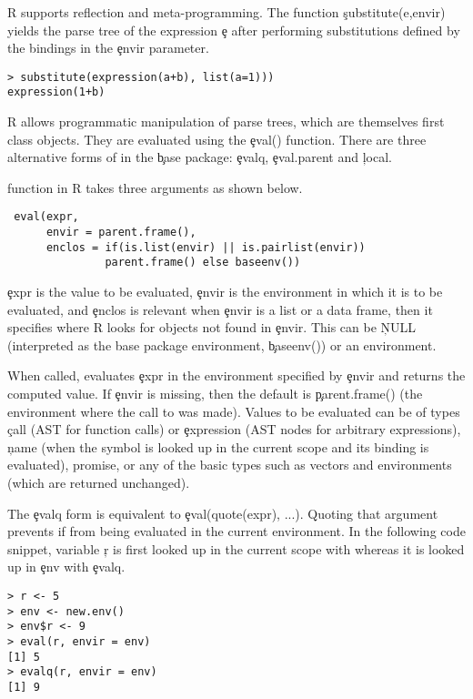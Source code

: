 \documentclass[USenglish,cleveref, autoref, thm-restate]{lipics-v2019}
\begin{document}
R supports reflection and meta-programming. The function \c{substitute(e,envir)}
yields the parse tree of the expression \c{e} after performing substitutions
defined by the bindings in the \c{envir} parameter.

\begin{lstlisting}
> substitute(expression(a+b), list(a=1)))  
expression(1+b)
\end{lstlisting}

\noindent
R allows programmatic manipulation of parse trees, which are themselves
first class objects. They are evaluated using the \c{eval()}
function. There are three alternative forms  of \eval in the \c{base} package:
\c{evalq}, \c{eval.parent} and \c{local}.

\eval function in R takes three arguments as shown below.
\begin{lstlisting}
 eval(expr,
      envir = parent.frame(),
      enclos = if(is.list(envir) || is.pairlist(envir))
               parent.frame() else baseenv())
\end{lstlisting}           

\c{expr} is the value to be evaluated, \c{envir}
is the environment in which it is to be evaluated, and \c{enclos} is
relevant when \c{envir} is a list or a data frame, then it specifies where R
looks for objects not found in \c{envir}. This can be \c{NULL} (interpreted
as the base package environment, \c{baseenv()}) or an environment.

When called, \eval evaluates \c{expr} in the environment specified by
\c{envir} and returns the computed value. If \c{envir} is missing, then the
default is \c{parent.frame()} (the environment where the call to \eval was
made).  Values to be evaluated can be of types \c{call} (AST for function
calls) or \c{expression} (AST nodes for arbitrary expressions), \c{name}
(when the symbol is looked up in the current scope and its binding is
evaluated), promise, or any of the basic types such as vectors and
environments (which are returned unchanged).

The \c{evalq} form is equivalent to \c{eval(quote(expr), ...)}.  Quoting
that argument prevents if from being evaluated in the current environment.
In the following code snippet, variable \c{r} is first looked up in
the current scope with \eval whereas it is looked up in \c{env} with
\c{evalq}.

\begin{lstlisting}
> r <- 5
> env <- new.env()
> env$r <- 9
> eval(r, envir = env)
[1] 5
> evalq(r, envir = env)
[1] 9
\end{lstlisting}
\end{document}
